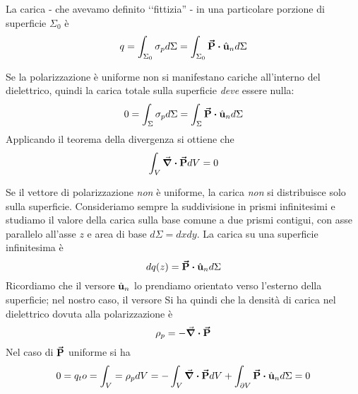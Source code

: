 \noindent La carica - che avevamo definito ‘‘fittizia'' - in una particolare porzione di superficie $\Sigma_0$ è
\begin{equation}
	q=\int_{\Sigma_0}\sigma_pd\Sigma=\int_{\Sigma_0}\vba{P}\vdot \vbh{u}_nd\Sigma
	\end{equation}
\begin{observe}
	Se la polarizzazione è uniforme non si manifestano cariche all'interno del dielettrico, quindi la carica totale sulla superficie \textit{deve} essere nulla:
	\begin{equation*}
		0=\int_{\Sigma} \sigma_p d\Sigma=\int_\Sigma \vba{P}\vdot\vbh{u}_nd\Sigma
	\end{equation*}
	Applicando il teorema della divergenza si ottiene che
	\begin{equation}
		\int_{V}\div{\vb*{\va{P}}}dV=0
	\end{equation}
\end{observe}
Se il vettore di polarizzazione \textit{non} è uniforme, la carica \textit{non} si distribuisce solo sulla superficie. Consideriamo sempre la suddivisione in prismi infinitesimi e studiamo il valore della carica sulla base comune a due prismi contigui, con asse parallelo all'asse $z$ e area di base $d\Sigma=dxdy$.
La carica su una superficie infinitesima è
\begin{equation*}
	dq(z)=\vba{P}\vdot \vbh{u}_nd\Sigma
\end{equation*}
Ricordiamo che il versore $\hat{\mathbf{u}}_n$ lo prendiamo orientato verso l'esterno della superficie; nel nostro caso, il versore
Si ha quindi che la densità di carica nel dielettrico dovuta alla polarizzazione è
\begin{equation}
	\rho_p=-\div{\vb*{\va{P}}}
\end{equation}
Nel caso di $\vb*{\va{P}}$ uniforme si ha
\begin{equation*}
	0=q_to=\int_V=\rho_pdV=-\int_V\div{\vba{P}}dV+\int_{\partial V}\vba{P}\vdot\vbh{u}_n d\Sigma=0
\end{equation*}
